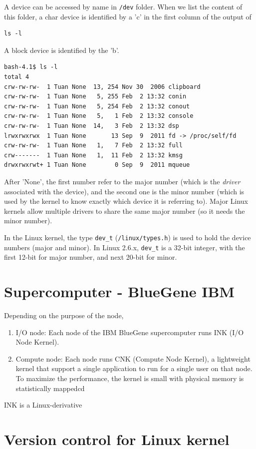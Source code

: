 A device can be accessed by name in \verb!/dev! folder. When we list the
content of this folder, a char device is identified by a 'c' in the first column
of the output of
\begin{verbatim}
ls -l
\end{verbatim}
A block device is identified by the 'b'.
\begin{verbatim}
bash-4.1$ ls -l
total 4
crw-rw-rw-  1 Tuan None  13, 254 Nov 30  2006 clipboard
crw-rw-rw-  1 Tuan None   5, 255 Feb  2 13:32 conin
crw-rw-rw-  1 Tuan None   5, 254 Feb  2 13:32 conout
crw-rw-rw-  1 Tuan None   5,   1 Feb  2 13:32 console
crw-rw-rw-  1 Tuan None  14,   3 Feb  2 13:32 dsp
lrwxrwxrwx  1 Tuan None       13 Sep  9  2011 fd -> /proc/self/fd
crw-rw-rw-  1 Tuan None   1,   7 Feb  2 13:32 full
crw-------  1 Tuan None   1,  11 Feb  2 13:32 kmsg
drwxrwxrwt+ 1 Tuan None        0 Sep  9  2011 mqueue
\end{verbatim} 
After 'None', the first number refer to the major number (which is the {\it
driver} associated with the device), and the second one is the minor number
(which is used by the kernel to know exactly which device it is referring to).
Major Linux kernels allow multiple drivers to share the same major number (so
it needs the minor number).

In the Linux kernel, the type \verb!dev_t! (\verb!/linux/types.h!) is used to
hold the device numbers (major and minor). In Linux 2.6.x, \verb!dev_t! is a
32-bit integer, with the first 12-bit for major number, and next 20-bit for
minor.



\section{Supercomputer - BlueGene IBM}
\label{sec:kernel_IBM_BlueGene}

Depending on the purpose of the node, 
\begin{enumerate}
  \item I/O node: Each node of the IBM BlueGene
supercomputer runs INK (I/O Node Kernel).
  \item Compute node: Each node runs CNK (Compute Node Kernel), a lightweight
  kernel that support a single application to run for a single user on that
  node. To maximize the performance, the kernel is small with physical memory is
  statistically mappedcd
\end{enumerate}
INK is a Linux-derivative

\section{Version control for Linux kernel}

